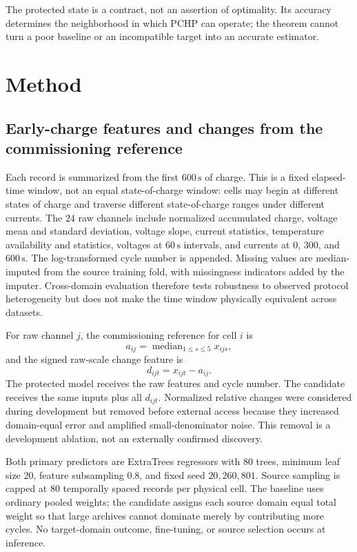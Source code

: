 \documentclass[preprint,12pt]{elsarticle}
\begin{document}
The protected state is a contract, not an assertion of optimality. Its accuracy determines the neighborhood in which PCHP can operate; the theorem cannot turn a poor baseline or an incompatible target into an accurate estimator.

\section{Method}

\subsection{Early-charge features and changes from the commissioning reference}

Each record is summarized from the first $600\,\mathrm{s}$ of charge. This is a fixed elapsed-time window, not an equal state-of-charge window: cells may begin at different states of charge and traverse different state-of-charge ranges under different currents. The $24$ raw channels include normalized accumulated charge, voltage mean and standard deviation, voltage slope, current statistics, temperature availability and statistics, voltages at $60\,\mathrm{s}$ intervals, and currents at $0$, $300$, and $600\,\mathrm{s}$. The log-transformed cycle number is appended. Missing values are median-imputed from the source training fold, with missingness indicators added by the imputer. Cross-domain evaluation therefore tests robustness to observed protocol heterogeneity but does not make the time window physically equivalent across datasets.

For raw channel $j$, the commissioning reference for cell $i$ is
\begin{equation}
  a_{ij}=\operatorname{median}_{1\leq s\leq5}x_{ijs},
\end{equation}
and the signed raw-scale change feature is
\begin{equation}
  d_{ijt}=x_{ijt}-a_{ij}.
  \label{eq:change}
\end{equation}
The protected model receives the raw features and cycle number. The candidate receives the same inputs plus all $d_{ijt}$. Normalized relative changes were considered during development but removed before external access because they increased domain-equal error and amplified small-denominator noise. This removal is a development ablation, not an externally confirmed discovery.

Both primary predictors are ExtraTrees regressors with $80$ trees, minimum leaf size $20$, feature subsampling $0.8$, and fixed seed $20{,}260{,}801$. Source sampling is capped at $80$ temporally spaced records per physical cell. The baseline uses ordinary pooled weights; the candidate assigns each source domain equal total weight so that large archives cannot dominate merely by contributing more cycles. No target-domain outcome, fine-tuning, or source selection occurs at inference.
\end{document}
